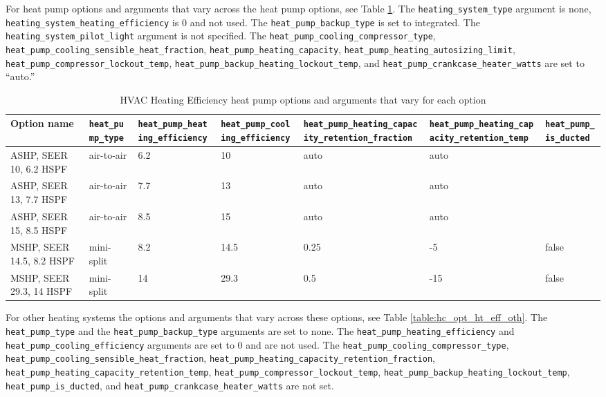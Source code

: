 For heat pump options and arguments that vary across the heat pump options, see Table \ref{table:hc_opt_ht_eff_hp}. The \texttt{heating\_system\_type} argument is none, \texttt{heating\_system\_heating\_efficiency} is 0 and not used. The \texttt{heat\_pump\_backup\_type} is set to integrated. The \texttt{heating\_system\_pilot\_light} argument is not specified. The \texttt{heat\_pump\_cooling\_compressor\_type}, 
\texttt{heat\_pump\_cooling\_sensible\_heat\_fraction}, 
\texttt{heat\_pump\_heating\_capacity}, \texttt{heat\_pump\_heating\_autosizing\_limit}, \texttt{heat\_pump\_compressor\_lockout\_temp}, \texttt{heat\_pump\_backup\_heating\_lockout\_temp}, and \texttt{heat\_pump\_crankcase\_heater\_watts} are set to ``auto.''

\begin{longtable}[]{ |p{2.2cm}|p{1.5cm}|p{2.1cm}|p{2.1cm}|p{2.2cm}|p{2.2cm}|p{1.4cm}| }
\caption{HVAC Heating Efficiency heat pump options and arguments that vary for each option} \label{table:hc_opt_ht_eff_hp} \\
\toprule\noalign{}
Option name &
\texttt{heat\_pump\_type} &
\texttt{heat\_pump\_heating\_efficiency} &
\texttt{heat\_pump\_cooling\_efficiency} &
\texttt{heat\_pump\_heating\_capacity\_retention\_fraction} & \texttt{heat\_pump\_heating\_capacity\_retention\_temp} &
\texttt{heat\_pump\_is\_ducted} \\
\midrule\noalign{}
\endhead
\bottomrule\noalign{}
\endlastfoot
ASHP, SEER 10, 6.2 HSPF &
air-to-air & 6.2 & 10 & auto &
auto & \\
ASHP, SEER 13, 7.7 HSPF &
air-to-air & 7.7 & 13 & auto &
auto & \\
ASHP, SEER 15, 8.5 HSPF &
air-to-air & 8.5 & 15 & auto &
auto & \\
MSHP, SEER 14.5, 8.2 HSPF &
mini-split & 8.2 & 14.5 & 0.25
& -5 & false \\
MSHP, SEER 29.3, 14 HSPF &
mini-split & 14 & 29.3 & 0.5 &
-15  & false \\
\end{longtable}

For other heating systems the options and arguments that vary across these options, see Table \ref{table:hc_opt_ht_eff_oth}. The \texttt{heat\_pump\_type} and the \texttt{heat\_pump\_backup\_type} arguments are set to none. The \texttt{heat\_pump\_heating\_efficiency} and \texttt{heat\_pump\_cooling\_efficiency} arguments are set to 0 and are not used. The \texttt{heat\_pump\_cooling\_compressor\_type}, \texttt{heat\_pump\_cooling\_sensible\_heat\_fraction}, \texttt{heat\_pump\_heating\_capacity\_retention\_fraction},  \texttt{heat\_pump\_heating\_capacity\_retention\_temp}, \texttt{heat\_pump\_compressor\_lockout\_temp}, \texttt{heat\_pump\_backup\_heating\_lockout\_temp}, \texttt{heat\_pump\_is\_ducted}, and \texttt{heat\_pump\_crankcase\_heater\_watts} are not set.

